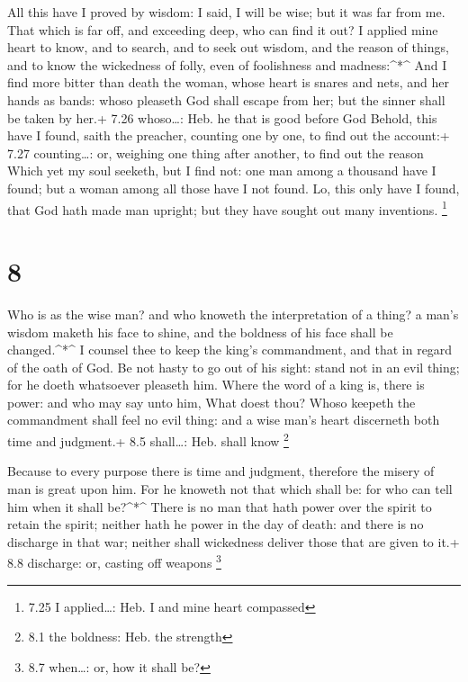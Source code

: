  All this have I proved by wisdom: I said, I will be wise;
but it was far from me.  That which is far off, and
exceeding deep, who can find it out?  I applied mine heart
to know, and to search, and to seek out wisdom, and the reason of
things, and to know the wickedness of folly, even of foolishness and
madness:\^{}*\^{}  And I find more bitter than death the
woman, whose heart is snares and nets, and her hands as bands: whoso
pleaseth God shall escape from her; but the sinner shall be taken by
her.+ 7.26 whoso\ldots: Heb. he that is good before God 
Behold, this have I found, saith the preacher, counting one by one, to
find out the account:+ 7.27 counting\ldots: or, weighing one thing after
another, to find out the reason  Which yet my soul seeketh,
but I find not: one man among a thousand have I found; but a woman among
all those have I not found.  Lo, this only have I found,
that God hath made man upright; but they have sought out many
inventions. \footnote{7.25 I applied\ldots: Heb. I and mine heart
  compassed}

\hypertarget{section-7}{%
\section{8}\label{section-7}}

 Who is as the wise man? and who knoweth the interpretation
of a thing? a man's wisdom maketh his face to shine, and the boldness of
his face shall be changed.\^{}*\^{}  I counsel thee to keep
the king's commandment, and that in regard of the oath of God.
 Be not hasty to go out of his sight: stand not in an evil
thing; for he doeth whatsoever pleaseth him.  Where the word
of a king is, there is power: and who may say unto him, What doest thou?
 Whoso keepeth the commandment shall feel no evil thing: and
a wise man's heart discerneth both time and judgment.+ 8.5 shall\ldots:
Heb. shall know \footnote{8.1 the boldness: Heb. the strength}

 Because to every purpose there is time and judgment,
therefore the misery of man is great upon him.  For he
knoweth not that which shall be: for who can tell him when it shall
be?\^{}*\^{}  There is no man that hath power over the
spirit to retain the spirit; neither hath he power in the day of death:
and there is no discharge in that war; neither shall wickedness deliver
those that are given to it.+ 8.8 discharge: or, casting off weapons
\footnote{8.7 when\ldots: or, how it shall be?}


